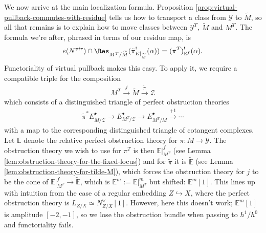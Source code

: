 \documentclass[12pt,dvipsnames]{amsart}
\begin{document}
We now arrive at the main localization formula. Proposition \ref{prop:virtual-pullback-commutes-with-residue} tells us how to transport a class from \(\mathcal Y\) to \(\widetilde M\), so all that remains is to explain how to move classes between \(\mathcal Y^T\), \(\widetilde M\) and \(M^T\). The formula we're after, phrased in terms of our residue map, is
\begin{align*}
  e(N^{vir})\cap \Res_{M^T/\widetilde{M}}(\tilde{\pi}_{E|_{\widetilde{M}}}^!(\alpha)) = (\pi^T)^!_{\mathbb{E}^f}(\alpha).
\end{align*}
Functoriality of virtual pullback \cite[Theorem 4.8]{manolache_VirtualPullbacks2012} makes this easy. To apply it, we require a compatible triple \cite[Definition 4.5]{manolache_VirtualPullbacks2012} for the composition
\begin{align*}
  M^T \xrightarrow{j} \widetilde M \xrightarrow{\widetilde \pi} \mathcal Z
\end{align*}
which consists of a distinguished triangle of perfect obstruction theories
\begin{align*}
  \widetilde \pi^* E^\bullet_{\widetilde M/\mathcal Z} \to E^\bullet_{M^T/\mathcal Z} \to E^\bullet_{M^T/\widetilde M} \xrightarrow{+1} \cdots
\end{align*}
with a map to the corresponding distinguished triangle of cotangent complexes. Let \(\mathbb E\) denote the relative perfect obstruction theory for \(\pi:M\to \mathcal Y\). The obstruction theory we wish to use for \(\pi^T\) is then \(\mathbb E|_{M^T}^f\) (see Lemma \ref{lem:obstruction-theory-for-the-fixed-locus}) and for \(\widetilde \pi\) it is \(\widetilde {\mathbb E}\) (see Lemma \ref{lem:obstruction-theory-for-tilde-M}), which forces the obstruction theory for \(j\) to be the cone of \(\mathbb E|_{M^T}^f\to \widetilde{\mathbb E}\), which is \(\mathbb E^m := \mathbb E|_{M^T}^m\) but shifted: \(\mathbb E^m[1]\). This lines up with intuition from the case of a regular embedding \(Z\hookrightarrow X\), where the perfect obstruction theory is \(L_{Z/X} \simeq N^\vee_{Z/X}[1]\). However, here this doesn't work; \(\mathbb E^m[1]\) is amplitude \([-2,-1]\), so we lose the obstruction bundle when passing to \(h^1/h^0\) and functoriality fails.
\end{document}

